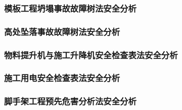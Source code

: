 \subsubsection{模板工程坍塌事故故障树法安全分析}
\subsubsection{高处坠落事故故障树法安全分析}
\subsubsection{物料提升机与施工升降机安全检查表法安全分析}

\subsubsection{施工用电安全检查表法安全分析}
\subsubsection{脚手架工程预先危害分析法安全分析}
